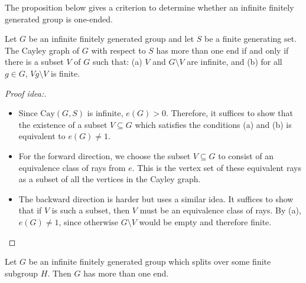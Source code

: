  The proposition below gives a criterion to determine whether an infinite finitely generated group is one-ended. 
 
\begin{proposition} 
\label{prop:criterion}
Let \(G\) be an infinite finitely generated group and let \(S\) be a  finite generating set.
The Cayley graph of \(G\) with respect to \(S\) has more than one end if and only if there is a subset \(V\) of \(G\) such that:
    (a) \(V\) and \(G \setminus V\) are infinite, and
    (b) for all \(g \in G\), \(Vg \setminus V\) is finite.
\end{proposition}

\begin{proof}[Proof idea:]
~\begin{itemize}
    \item Since \(\mathrm{Cay}(G,S)\) is infinite, \(e(G) > 0\). Therefore, it suffices to show that the existence of a subset \(V \subseteq G\) which satisfies the conditions (a) and (b) is equivalent to \(e(G) \neq 1\).
    \item For the forward direction, we choose the subset \(V \subseteq G\) to consist of an equivalence class of rays from \(e\). This is the vertex set of these equivalent rays as a subset of all the vertices in the Cayley graph.
    \item The backward direction is harder but uses a similar idea. It suffices to show that if \(V\) is such a subset, then \(V\) must be an equivalence class of rays. By (a), \(e(G) \neq 1\), since otherwise \(G \setminus V\) would be empty and therefore finite.
\end{itemize}
\end{proof}

\begin{theorem}
\label{backimp}
    Let \(G\) be an infinite finitely generated group which splits over some finite subgroup \(H\). Then \(G\) has more than one end.
\end{theorem}

